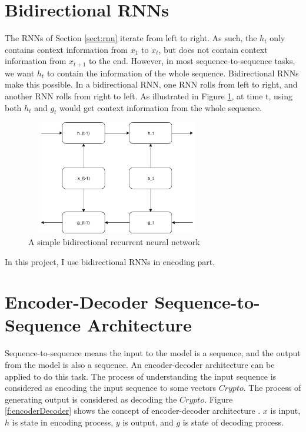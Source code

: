 \documentclass[modernstyle,12pt]{sjsuthesis}
\theoremstyle{definition}
\begin{document}
\section{Bidirectional RNNs}

The RNNs of Section \ref{sect:rnn}
iterate from left to right. As such, the $h_t$ only contains context information from $x_1$ to $x_t$, but does not contain context information from $x_{t+1}$ to the end. However, in most sequence-to-sequence tasks, we want $h_t$ to contain the information of the whole sequence. Bidirectional RNNs make this possible. In a bidirectional RNN, one RNN rolls from left to right, and another RNN rolls from right to left. As illustrated in Figure \ref{f:bidirectionalRnn}, at time t, using both $h_t$ and $g_t$ would get context information from the whole sequence.

\begin{figure}[htbp]\centering
  \includegraphics[width=8cm, height=5cm]{figures/bidirectionalRnn.png}
  \caption{A simple bidirectional recurrent neural network}
  \label{f:bidirectionalRnn}
\end{figure}

In this project, I use bidirectional RNNs in encoding part.

\section{Encoder-Decoder Sequence-to-Sequence Architecture}

Sequence-to-sequence means the input to the model is a sequence, and the output from the model is also a sequence. An encoder-decoder architecture can be applied to do this task. The process of understanding the input sequence is considered as encoding the input sequence to some vectors $Crypto$. The process of generating output is considered as decoding the $Crypto$. Figure \ref{f:encoderDecoder} shows the concept of encoder-decoder architecture . $x$ is input, $h$ is state in encoding process, $y$ is output, and $g$ is state of decoding process.
\end{document}
